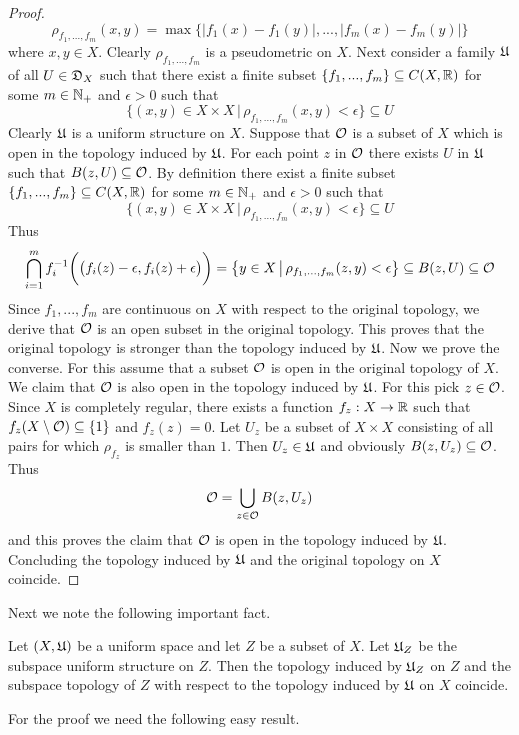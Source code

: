 \begin{proof}
$$\rho_{f_1,...,f_m}(x,y) = \max \big\{|f_1(x) - f_1(y)|,...,|f_m(x) - f_m(y)|\big\}$$
where $x,y\in X$. Clearly $\rho_{f_1,...,f_m}$ is a pseudometric on $X$. Next consider a family ${\mathfrak U}$ of all $U\in {\mathfrak D}_X$ such that there exist a finite subset $\{f_1,...,f_m\}\subseteq C(X,{\mathbb R})$ for some $m \in {\mathbb N}_+$ and $\epsilon > 0$ such that
$$\big\{(x,y)\in X\times X\,\big|\,\rho_{f_1,...,f_m}(x,y) < \epsilon\big\}\subseteq U$$
Clearly ${\mathfrak U}$ is a uniform structure on $X$. Suppose that ${\mathcal O}$ is a subset of $X$ which is open in the topology induced by ${\mathfrak U}$. For each point $z$ in ${\mathcal O}$ there exists $U$ in ${\mathfrak U}$ such that $B(z,U)\subseteq {\mathcal O}$. By definition there exist a finite subset $\{f_1,...,f_m\}\subseteq C(X,{\mathbb R})$ for some $m \in {\mathbb N}_+$ and $\epsilon > 0$ such that
$$\big\{(x,y)\in X\times X\,\big|\,\rho_{f_1,...,f_m}(x,y) < \epsilon\big\}\subseteq U$$
Thus
$$\bigcap_{i=1}^mf_i^{-1}\bigg(\big(f_i(z) - \epsilon, f_i(z) + \epsilon\big)\bigg) = \big\{y\in X \,\big|\, \rho_{f_1,...,f_m}(z,y) < \epsilon\big\} \subseteq B(z,U)\subseteq {\mathcal O}$$
Since $f_1,...,f_m$ are continuous on $X$ with respect to the original topology, we derive that ${\mathcal O}$ is an open subset in the original topology. This proves that the original topology is stronger than the topology induced by ${\mathfrak U}$. Now we prove the converse. For this assume that a subset ${\mathcal O}$ is open in the original topology of $X$. We claim that ${\mathcal O}$ is also open in the topology induced by ${\mathfrak U}$. For this pick $z \in {\mathcal O}$. Since $X$ is completely regular, there exists a function $f_z:X\rightarrow {\mathbb R}$ such that $f_z(X\setminus {\mathcal O})\subseteq \{1\}$ and $f_z(z) = 0$. Let $U_z$ be a subset of $X\times X$ consisting of all pairs for which $\rho_{f_z}$ is smaller than $1$. Then $U_z\in {\mathfrak U}$ and obviously $B(z,U_z)\subseteq {\mathcal O}$. Thus
$${\mathcal O} = \bigcup_{z\in {\mathcal O}}B(z,U_z)$$
and this proves the claim that ${\mathcal O}$ is open in the topology induced by ${\mathfrak U}$. Concluding the topology induced by ${\mathfrak U}$ and the original topology on $X$ coincide.
\end{proof}
\noindent
Next we note the following important fact.

\begin{theorem}\label{theorem:the_induced_topology_preserves_uniform_subspaces}
Let $(X,{\mathfrak U})$ be a uniform space and let $Z$ be a subset of $X$. Let ${\mathfrak U}_Z$ be the subspace uniform structure on $Z$. Then the topology induced by ${\mathfrak U}_Z$ on $Z$ and the subspace topology of $Z$ with respect to the topology induced by ${\mathfrak U}$ on $X$ coincide.
\end{theorem}
\noindent
For the proof we need the following easy result.


